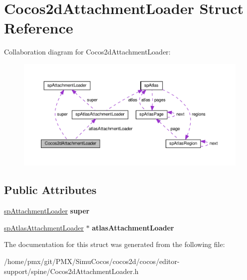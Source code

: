 \hypertarget{structCocos2dAttachmentLoader}{}\section{Cocos2d\+Attachment\+Loader Struct Reference}
\label{structCocos2dAttachmentLoader}


Collaboration diagram for Cocos2d\+Attachment\+Loader\+:
\nopagebreak
\begin{figure}[H]
\begin{center}
\leavevmode
\includegraphics[width=350pt]{structCocos2dAttachmentLoader__coll__graph}
\end{center}
\end{figure}
\subsection*{Public Attributes}
\begin{DoxyCompactItemize}
\item 
\mbox{\label{structCocos2dAttachmentLoader_a63234773d1b7ea8a4fdbadc1e4a50a90}} 
\hyperlink{structspAttachmentLoader}{sp\+Attachment\+Loader} {\bfseries super}
\item 
\mbox{\label{structCocos2dAttachmentLoader_adefa1b402ce38d2f9803b64985f842f1}} 
\hyperlink{structspAtlasAttachmentLoader}{sp\+Atlas\+Attachment\+Loader} $\ast$ {\bfseries atlas\+Attachment\+Loader}
\end{DoxyCompactItemize}


The documentation for this struct was generated from the following file\+:\begin{DoxyCompactItemize}
\item 
/home/pmx/git/\+P\+M\+X/\+Simu\+Cocos/cocos2d/cocos/editor-\/support/spine/Cocos2d\+Attachment\+Loader.\+h\end{DoxyCompactItemize}
